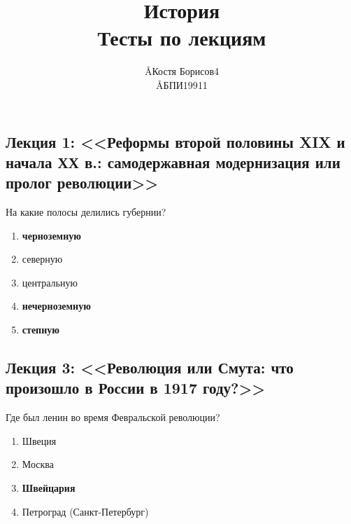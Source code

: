 \documentclass[12pt]{article}
\title{История \\ Тесты по лекциям}
\author{\AA{Костя Борисов}{4} \\ \AA{БПИ199}{11}}
\begin{document}
  \maketitle

  \subsection*{Лекция 1: <<Реформы второй половины XIX и начала ХХ в.: самодержавная модернизация или пролог революции>>}
  На какие полосы делились губернии?
  \begin{enumerate}
    \item \textbf{черноземную}
    \item северную
    \item центральную
    \item \textbf{нечерноземную}
    \item \textbf{степную}
  \end{enumerate}

  \subsection*{Лекция 3: <<Революция или Смута: что произошло в России в 1917 году?>>}
  Где был ленин во время Февральской революции?
  \begin{enumerate}
    \item Швеция
    \item Москва
    \item \textbf{Швейцария}
    \item Петроград (Санкт-Петербург)
  \end{enumerate}
\end{document}
